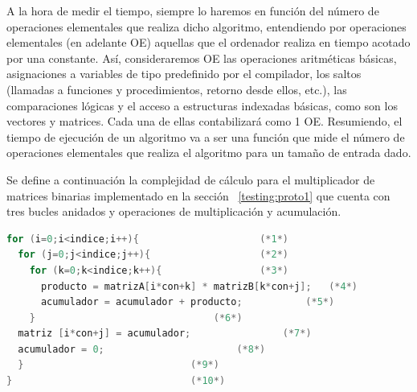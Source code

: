  		A la hora de medir el tiempo, siempre lo haremos en función del número de operaciones elementales que realiza dicho algoritmo, entendiendo por
 		operaciones elementales (en adelante OE) aquellas que el ordenador realiza en tiempo acotado por una constante. Así, consideraremos OE las
 		operaciones aritméticas básicas,  asignaciones a variables de tipo predefinido por el compilador, los saltos (llamadas a funciones y
 		procedimientos, retorno desde ellos, etc.), las comparaciones lógicas y el acceso a estructuras indexadas básicas, como son los vectores y
 		matrices. Cada una de ellas contabilizará como 1 OE. Resumiendo, el tiempo de ejecución de un algoritmo va a ser una función que mide el número de
 		operaciones elementales que realiza el algoritmo para un tamaño de entrada dado.
		
		Se define a continuación la complejidad de cálculo para el multiplicador de matrices binarias implementado en la sección ~\ref {testing:proto1} que
		cuenta con tres bucles anidados y operaciones de multiplicación y acumulación.
	
\newpage			
	\begin{lstlisting}[language=C,frame=single , caption={Código del programa de prueba multiplicador de matrices binarias}]
for (i=0;i<indice;i++){						(*1*)
  for (j=0;j<indice;j++){					(*2*)
    for (k=0;k<indice;k++){					(*3*)
	  producto = matrizA[i*con+k] * matrizB[k*con+j];	(*4*)
	  acumulador = acumulador + producto;			(*5*) 
    }								(*6*)
  matriz [i*con+j] = acumulador;				(*7*)
  acumulador = 0;						(*8*)
  }								(*9*)
}								(*10*)
	\end{lstlisting}
		

